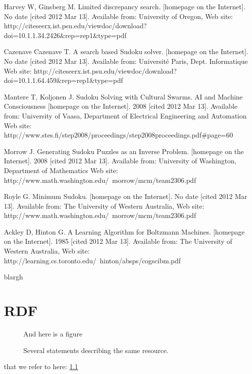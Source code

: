 \documentclass[a4paper,11pt]{kth-mag}
\begin{document}
\begin{thebibliography}{99}
Harvey W, Ginsberg M. Limited discrepancy search. [homepage on the Internet]. No date [cited 2012 Mar 13]. Available from: University of Oregon, Web site: http://citeseerx.ist.psu.edu/viewdoc/download?doi=10.1.1.34.2426\&rep=rep1\&type=pdf

Cazenave Cazenave T. A search based Sudoku solver. [homepage on the Internet]. No date [cited 2012 Mar 13]. Available from: Université Paris, Dept. Informatique Web site: http://citeseerx.ist.psu.edu/viewdoc/download?doi=10.1.1.64.459\&rep=rep1\&type=pdf

Mantere T, Koljonen J. Sudoku Solving with Cultural Swarms. AI and Machine Consciousness [homepage on the Internet]. 2008 [cited 2012 Mar 13]. Available from: University of Vaasa, Department of Electrical Engineering and Automation Web site: http://www.stes.fi/step2008/proceedings/step2008proceedings.pdf\#page=60

Morrow J. Generating Sudoku Puzzles as an Inverse Problem. [homepage on the Internet]. 2008 [cited 2012 Mar 13]. Available from: University of Washington, Department of Mathematics Web site: http://www.math.washington.edu/~morrow/mcm/team2306.pdf

Royle G. Minimum Sudoku. [homepage on the Internet]. No date [cited 2012 Mar 13]. Available from: The University of Western Australia, Web site: http://www.math.washington.edu/~morrow/mcm/team2306.pdf

Ackley D, Hinton G. A Learning Algorithm for Boltzmann Machines. [homepage on the Internet]. 1985 [cited 2012 Mar 13]. Available from: The University of Western Australia, Web site: http://learning.cs.toronto.edu/~hinton/absps/cogscibm.pdf

blargh
\end{thebibliography}

\appendix
\addappheadtotoc
\chapter{RDF}\label{appA}

\begin{figure}[ht]
\begin{center}
And here is a figure
\caption{\small{Several statements describing the same resource.}}\label{RDF_4}
\end{center}
\end{figure}

that we refer to here: \ref{RDF_4}
\end{document}
